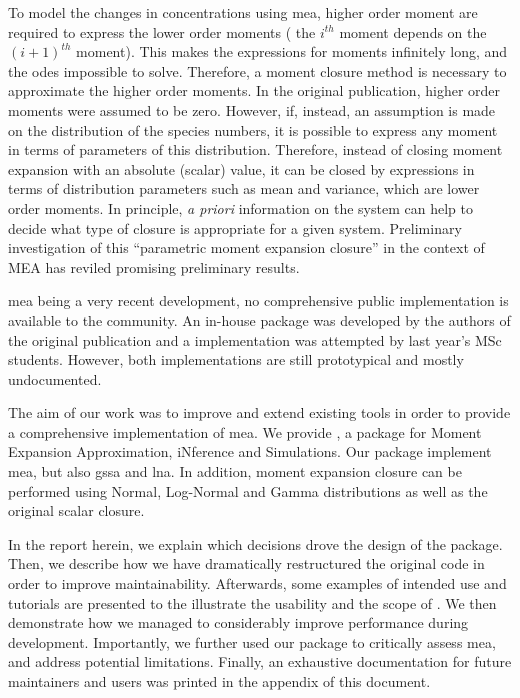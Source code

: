 To model the changes in concentrations using \gls{mea}, higher order moment are required to express the lower order moments
(\ie{} the $i^{th}$ moment depends on the $(i+1)^{th}$ moment).
This makes the expressions for moments infinitely long, and the \glspl{ode} impossible to solve.
Therefore, a moment closure method is necessary to approximate the higher order moments.
In the original publication\cite{ale_general_2013}, higher order moments were assumed to be zero.
However, if, instead, an assumption is made on the distribution of the species numbers, it is possible
to express any moment in terms of parameters of this distribution\cite{milner_moment_2011}.
Therefore, instead of closing moment expansion with an absolute (scalar) value, it can be closed by expressions in
terms of distribution parameters such as mean and variance, which are lower order moments.
In principle, \emph{a priori} information on the system can help to decide what type of closure is appropriate for a given system.
Preliminary investigation of this ``parametric moment expansion closure'' in the context of MEA has reviled promising preliminary results\cite{lakatos_preparation_2014}.

\gls{mea} being a very recent development, no comprehensive public implementation is available to the community.
An in-house \mat{} package was developed by the authors of the original publication and a \py{} implementation was attempted by last year's MSc students\cite{babtie_moment_2013}.
However, both implementations are still prototypical and mostly undocumented.
 
The aim of our work was to improve and extend existing tools in order to provide a comprehensive implementation of \gls{mea}.
We provide \means{}, a \py{} package for Moment Expansion Approximation, iNference and Simulations.
Our package implement \gls{mea}, but also \gls{gssa} and \gls{lna}.
In addition, moment expansion closure can be performed using Normal, Log-Normal and Gamma distributions as well as the original scalar closure.

In the report herein, we explain which decisions drove the design of the package.
Then, we describe how we have dramatically restructured the original code in order to improve maintainability.
Afterwards, some examples of intended use and tutorials are presented to the illustrate the usability and the scope of \means.
We then demonstrate how we managed to considerably improve performance during development.
Importantly, we further used our package to critically assess \gls{mea}, and address potential limitations.
Finally, an exhaustive documentation for future maintainers and users was printed in the appendix of this document.